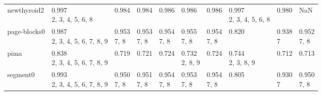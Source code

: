 \begin{tabular}{llllllllll}
newthyroid2            &        \makecell{0.997 \\ \scriptsize{2, 3, 4, 5, 6, 8}} &         \makecell{0.984 \\ \scriptsize{}} &      \makecell{0.984 \\ \scriptsize{}} &         \makecell{0.986 \\ \scriptsize{}} &         \makecell{0.986 \\ \scriptsize{}} &         \makecell{0.986 \\ \scriptsize{}} &  \makecell{0.997 \\ \scriptsize{2, 3, 4, 5, 6, 8}} &   \makecell{0.980 \\ \scriptsize{}} &                                          NaN \\
page-blocks0           &  \makecell{0.987 \\ \scriptsize{2, 3, 4, 5, 6, 7, 8, 9}} &     \makecell{0.953 \\ \scriptsize{7, 8}} &  \makecell{0.953 \\ \scriptsize{7, 8}} &     \makecell{0.954 \\ \scriptsize{7, 8}} &     \makecell{0.955 \\ \scriptsize{7, 8}} &     \makecell{0.954 \\ \scriptsize{7, 8}} &                  \makecell{0.820 \\ \scriptsize{}} &  \makecell{0.938 \\ \scriptsize{7}} &        \makecell{0.952 \\ \scriptsize{7, 8}} \\
pima                   &  \makecell{0.838 \\ \scriptsize{2, 3, 4, 5, 6, 7, 8, 9}} &         \makecell{0.719 \\ \scriptsize{}} &      \makecell{0.721 \\ \scriptsize{}} &         \makecell{0.724 \\ \scriptsize{}} &  \makecell{0.732 \\ \scriptsize{2, 8, 9}} &         \makecell{0.724 \\ \scriptsize{}} &        \makecell{0.744 \\ \scriptsize{2, 3, 8, 9}} &   \makecell{0.712 \\ \scriptsize{}} &            \makecell{0.713 \\ \scriptsize{}} \\
segment0               &  \makecell{0.993 \\ \scriptsize{2, 3, 4, 5, 6, 7, 8, 9}} &     \makecell{0.950 \\ \scriptsize{7, 8}} &  \makecell{0.951 \\ \scriptsize{7, 8}} &     \makecell{0.954 \\ \scriptsize{7, 8}} &     \makecell{0.953 \\ \scriptsize{7, 8}} &     \makecell{0.954 \\ \scriptsize{7, 8}} &                  \makecell{0.805 \\ \scriptsize{}} &  \makecell{0.930 \\ \scriptsize{7}} &        \makecell{0.950 \\ \scriptsize{7, 8}} \\

\end{tabular}
